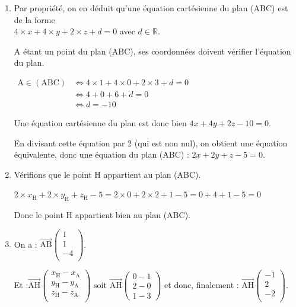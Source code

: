 \documentclass[10pt]{article}
\providecommand{\R}{\mathbb{R}}
\providecommand{\vect}[1]{\overrightarrow{#1}}
\providecommand{\vectt}[1]{\overrightarrow{\mathrm{#1}}}
\begin{document}
\begin{enumerate}
	$\vect{n}$ est donc orthogonal à deux vecteurs non colinéaires qui forment une base du plan (ABC), donc il est normal au plan (ABC).



	\item 	Par propriété, on en déduit qu'une équation cartésienne du plan (ABC) est de la forme \\
	$4 \times x + 4 \times y +2  \times z+d=0$ avec $d \in \R$.

	A étant un point du plan (ABC), ses coordonnées doivent vérifier l'équation du plan.

	$\begin{aligned}
		\mathrm{A} \in (\mathrm{ABC})
		&\iff  4 \times 1 + 4\times 0  +2  \times 3 + d = 0\\
		&\iff 4 + 0 + 6 +  d = 0\\
		&\iff d = -10
	\end{aligned}$

	Une équation cartésienne du plan est donc bien \quad$4x + 4y  +2 z -10   = 0$.

	En divisant cette équation par 2 (qui est non nul), on obtient une équation équivalente, donc une équation du plan (ABC) : \quad  $2x + 2y  + z -5   = 0$.

	\item Vérifions que le point H appartient au plan (ABC).

	$2\times x_\mathrm{H}+2 \times y_\mathrm{H}+z_\mathrm{H}-5 = 2 \times 0 + 2\times 2 + 1 -5 = 0+4+1-5=0$

	Donc le point H appartient bien au plan (ABC).

	\item  On a :\quad
	$\vectt{AB}
	\begin{pmatrix}
		1\\
		1\\
		-4\\
	\end{pmatrix}$.

	Et :\quad $\vectt{AH}
	\begin{pmatrix}
		x_\mathrm{H} - x_\mathrm{A}\\
		y_\mathrm{H} - y_\mathrm{A}\\
		z_\mathrm{H} - z_\mathrm{A}\\
	\end{pmatrix}$ \quad soit \quad
	$\vectt{AH}
	\begin{pmatrix}
		0 - 1\\
		2- 0\\
		1-3
	\end{pmatrix}$
	\quad et donc, finalement :\quad
	$\vectt{AH}
	\begin{pmatrix}
		-1\\
		2\\
		-2\\
	\end{pmatrix}$.


\end{enumerate}
\end{document}
